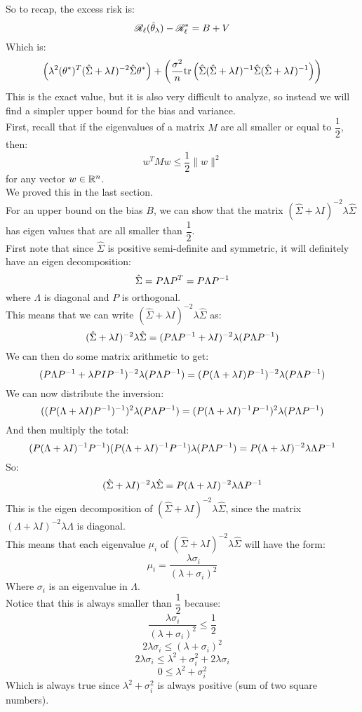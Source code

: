 \documentclass[12pt]{article}
\begin{document}
So to recap, the excess risk is:
\[ \mathscr{R}_{\ell}(\hat{\theta}_\lambda) - \mathscr{R}_{\ell}^*
= B + V \]
Which is:
\[ \left( \lambda^2(\theta^*)^T
(\hat{\Sigma} + \lambda I)^{-2}
\hat{\Sigma} \theta^* \right)
+ \left( \dfrac{\sigma^2}{n}
\text{tr}\left(  \hat{\Sigma} (\hat{\Sigma} + \lambda I)^{-1}
\hat{\Sigma}(\hat{\Sigma} + \lambda I)^{-1}  \right) \right) \]
This is the exact value, but it is
also very difficult to analyze,
so instead we will find a simpler upper bound
for the bias and variance. \\

First, recall that if the eigenvalues of a matrix $M$
are all smaller or equal to $\dfrac{1}{2}$, then:
\[ w^TMw \leq \dfrac{1}{2} \|w\|^2 \]
for any vector $w \in \mathbb{R}^n$. \\
We proved this in the last section. \\

For an upper bound on the bias $B$, 
we can show that the matrix
$(\hat{\Sigma} + \lambda I)^{-2}\lambda \hat{\Sigma}$
has eigen values that are all smaller than
$\dfrac{1}{2}$. \\
First note that since $\hat{\Sigma}$
is positive semi-definite and symmetric,
it will definitely have an eigen decomposition:
\[ \hat{\Sigma} = P\Lambda P^T = P\Lambda P^{-1} \]
where $\Lambda$ is diagonal and $P$ is orthogonal. \\
This means that we can write 
$(\hat{\Sigma} + \lambda I)^{-2}\lambda \hat{\Sigma}$ 
as:
\[ (\hat{\Sigma} + \lambda I)^{-2}\lambda \hat{\Sigma}
= (P\Lambda P^{-1} + \lambda I)^{-2} \lambda( P\Lambda P^{-1})\]
We can then do some matrix arithmetic to get:
\[ (P\Lambda P^{-1} + \lambda P I P^{-1})^{-2} 
\lambda( P\Lambda P^{-1})
= (P(\Lambda + \lambda I) P^{-1})^{-2} 
\lambda( P\Lambda P^{-1}) \]
We can now distribute the inversion:
\[ ((P(\Lambda + \lambda I) P^{-1})^{-1})^2
\lambda( P\Lambda P^{-1})
= (P(\Lambda + \lambda I)^{-1} P^{-1})^2 
\lambda( P\Lambda P^{-1}) \]
And then multiply the total:
\[ (P(\Lambda + \lambda I)^{-1} P^{-1})
(P(\Lambda + \lambda I)^{-1} P^{-1})\lambda( P\Lambda P^{-1})
=  P (\Lambda + \lambda I)^{-2} \lambda \Lambda P^{-1}\]
So:
\[ (\hat{\Sigma} + \lambda I)^{-2}\lambda \hat{\Sigma}
= P (\Lambda + \lambda I)^{-2} \lambda \Lambda P^{-1} \]
This is the eigen decomposition
of $(\hat{\Sigma} + \lambda I)^{-2}\lambda \hat{\Sigma}$,
since the matrix $(\Lambda + \lambda I)^{-2} \lambda \Lambda$
is diagonal. \\
This means that each eigenvalue $\mu_i$
of $(\hat{\Sigma} + \lambda I)^{-2}\lambda \hat{\Sigma}$
will have the form:
\[ \mu_i = 
\dfrac{\lambda \sigma_i}{(\lambda + \sigma_i)^2} \]
Where $\sigma_i$ is an eigenvalue in $\Lambda$. \\
Notice that this is always smaller than $\dfrac{1}{2}$
because:
\[ \dfrac{\lambda \sigma_i}{(\lambda + \sigma_i)^2}
\leq \dfrac{1}{2} \]
\[ 2\lambda \sigma_i
\leq (\lambda + \sigma_i)^2 \]
\[ 2\lambda \sigma_i
\leq \lambda^2 + \sigma_i^2 + 2\lambda \sigma_i \]
\[ 0 \leq \lambda^2 + \sigma_i^2 \]
Which is always true since $\lambda^2 + \sigma_i^2$
is always positive
(sum of two square numbers). \\
\end{document}
